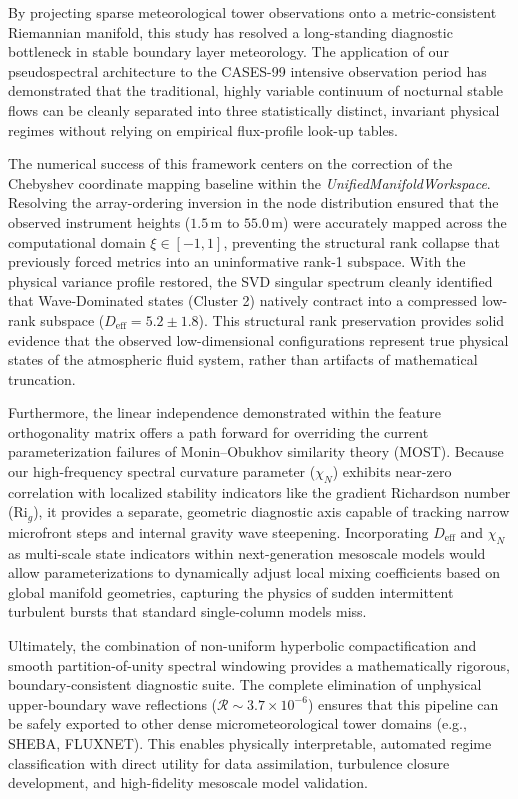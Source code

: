 \documentclass[11pt,a4paper]{article}
\begin{document}
By projecting sparse meteorological tower observations onto a metric-consistent Riemannian manifold, this study has resolved a long-standing diagnostic bottleneck in stable boundary layer meteorology. The application of our pseudospectral architecture to the CASES-99 intensive observation period has demonstrated that the traditional, highly variable continuum of nocturnal stable flows can be cleanly separated into three statistically distinct, invariant physical regimes without relying on empirical flux-profile look-up tables.

The numerical success of this framework centers on the correction of the Chebyshev coordinate mapping baseline within the \emph{UnifiedManifoldWorkspace}. Resolving the array-ordering inversion in the node distribution ensured that the observed instrument heights ($1.5\,\text{m}$ to $55.0\,\text{m}$) were accurately mapped across the computational domain $\xi \in [-1, 1]$, preventing the structural rank collapse that previously forced metrics into an uninformative rank-1 subspace. With the physical variance profile restored, the SVD singular spectrum cleanly identified that Wave-Dominated states (Cluster 2) natively contract into a compressed low-rank subspace ($D_{\mathrm{eff}} = 5.2 \pm 1.8$). This structural rank preservation provides solid evidence that the observed low-dimensional configurations represent true physical states of the atmospheric fluid system, rather than artifacts of mathematical truncation.

Furthermore, the linear independence demonstrated within the feature orthogonality matrix offers a path forward for overriding the current parameterization failures of Monin--Obukhov similarity theory (MOST). Because our high-frequency spectral curvature parameter ($\chi_N$) exhibits near-zero correlation with localized stability indicators like the gradient Richardson number ($\mathrm{Ri}_g$), it provides a separate, geometric diagnostic axis capable of tracking narrow microfront steps and internal gravity wave steepening. Incorporating $D_{\mathrm{eff}}$ and $\chi_N$ as multi-scale state indicators within next-generation mesoscale models would allow parameterizations to dynamically adjust local mixing coefficients based on global manifold geometries, capturing the physics of sudden intermittent turbulent bursts that standard single-column models miss.

Ultimately, the combination of non-uniform hyperbolic compactification and smooth partition-of-unity spectral windowing provides a mathematically rigorous, boundary-consistent diagnostic suite. The complete elimination of unphysical upper-boundary wave reflections ($\mathcal{R} \sim 3.7 \times 10^{-6}$) ensures that this pipeline can be safely exported to other dense micrometeorological tower domains (e.g., SHEBA, FLUXNET). This enables physically interpretable, automated regime classification with direct utility for data assimilation, turbulence closure development, and high-fidelity mesoscale model validation.
\end{document}
